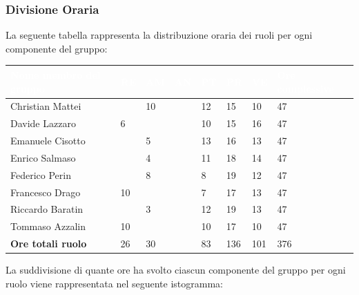 \subsubsection{Divisione Oraria}
La seguente tabella rappresenta la distribuzione oraria dei ruoli per ogni componente del gruppo:
{
	\renewcommand{\arraystretch}{2}
	\centering
	\begin{table}[h]
	\caption{Tabella della divisione oraria della Progettazione di Dettaglio e Codifica}
	
\begin{longtable}{ C{5cm} C{1cm} C{1cm} C{1cm} C{1cm} C{1cm} C{1cm} C{3cm}}
	\textcolor{white}{\textbf{Nome membro del gruppo}} & 
	\textcolor{white}{\textbf{RE}} & 
	\textcolor{white}{\textbf{AM}} & 
	\textcolor{white}{\textbf{AN}} & 
	\textcolor{white}{\textbf{PT}} & 
	\textcolor{white}{\textbf{PR}} & 
	\textcolor{white}{\textbf{VE}} & 
	\textcolor{white}{\textbf{Ore complessive}}\\
\endhead	
        
        Christian Mattei & & 10 & & 12 & 15 & 10 & 47\\
        Davide Lazzaro & 6 & & & 10 & 15 & 16 & 47\\
        Emanuele Cisotto & & 5 & & 13 & 16 & 13 & 47 \\
        Enrico Salmaso & & 4 & & 11 & 18 & 14 & 47\\
        Federico Perin & & 8 & & 8 & 19 & 12 & 47\\
        Francesco Drago & 10 & & & 7 & 17 & 13 & 47\\
        Riccardo Baratin & & 3 & & 12 & 19 & 13 & 47\\
        Tommaso Azzalin & 10 & & & 10 & 17 & 10 & 47 \\
        \textbf{Ore totali ruolo} & 26 & 30 & & 83 & 136 & 101 & 376\\
		
	\end{longtable}
\end{table}
}
\newline
La suddivisione di quante ore ha svolto ciascun componente del gruppo per ogni ruolo viene rappresentata nel seguente istogramma:



